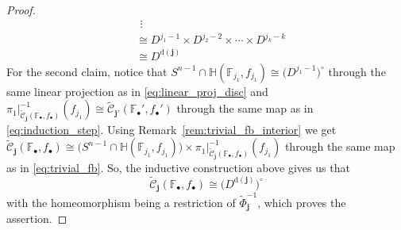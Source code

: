 \begin{proof}
\begin{align*}
&\ \,\vdots\\
&\cong D^{j_1-1}\times D^{j_2-2}\times\cdots\times D^{j_k-k}\\
&\cong D^{\mathrm{d}(\mathbf{j})}
\end{align*}
For the second claim, notice that
$S^{n-1}\cap\mathbb{H}(\mathbb{F}_{j_1},f_{j_1})\cong\big(D^{j_1-1}\big)^{\circ}$
through the same linear projection as in \eqref{eq:linear_proj_disc} and
$\pi_1|_{\tilde{\mathcal{C}}_{\mathbf{j}}(\mathbb{F}_{\bullet},f_{\bullet})}^{-1}(f_{j_1})\cong\tilde{\mathcal{C}}_{\mathbf{j}'}(\mathbb{F}_{\bullet}',f_{\bullet}')$
through the same map as in \eqref{eq:induction_step}. Using Remark~\ref{rem:trivial_fb_interior} we get
$\tilde{\mathcal{C}}_{\mathbf{j}}(\mathbb{F}_{\bullet},f_{\bullet})\cong\big(S^{n-1}\cap\mathbb{H}(\mathbb{F}_{j_1},f_{j_1})\big)\times\pi_1|_{\tilde{\mathcal{C}}_{\mathbf{j}}(\mathbb{F}_{\bullet},f_{\bullet})}^{-1}(f_{j_1})$
through the same map as in \eqref{eq:trivial_fb}.
So, the inductive construction above gives us that
\[\tilde{\mathcal{C}}_{\mathbf{j}}(\mathbb{F}_{\bullet},f_{\bullet})\cong\big(D^{\mathrm{d}(\mathbf{j})}\big)^{\circ}\]
with the homeomorphism being a restriction of $\tilde{\Phi}_{\mathbf{j}}^{-1}$, which proves the assertion.
\end{proof}


